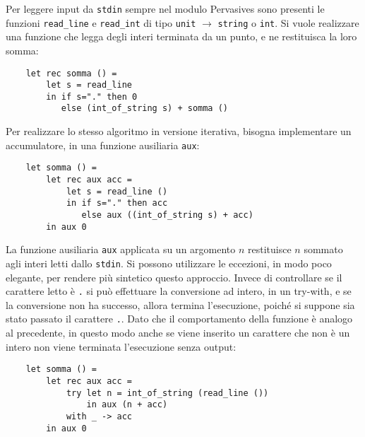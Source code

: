 \documentclass{article}
\numberwithin{equation}{subsection}
\begin{document}
Per leggere input da \verb|stdin| sempre nel modulo Pervasives sono presenti le funzioni \verb|read_line| e \verb|read_int| di tipo \verb|unit| $\rightarrow$ \verb|string| o \verb|int|. 
Si vuole realizzare una funzione che legga degli interi terminata da un punto, e ne restituisca la loro somma:
\begin{verbatim}
    let rec somma () =
        let s = read_line
        in if s="." then 0
           else (int_of_string s) + somma ()    
\end{verbatim}
Per realizzare lo stesso algoritmo in versione iterativa, bisogna implementare un accumulatore, in una funzione ausiliaria \verb|aux|:
\begin{verbatim}
    let somma () =
        let rec aux acc = 
            let s = read_line ()
            in if s="." then acc
               else aux ((int_of_string s) + acc)
        in aux 0
\end{verbatim}
La funzione ausiliaria \verb|aux| applicata su un argomento $n$ restituisce $n$ sommato agli interi letti dallo \verb|stdin|. Si possono utilizzare le eccezioni, in modo poco elegante, per rendere più sintetico questo approccio. Invece di controllare se il carattere letto è \verb|.| si può effettuare la conversione ad intero, in un try-with, e se la conversione non ha successo, allora termina l'esecuzione, poiché si suppone sia stato passato il carattere \verb|.|. Dato che il comportamento della funzione è analogo al precedente, in questo modo anche se viene inserito un carattere che non è un intero non viene terminata l'esecuzione senza output:
\begin{verbatim}
    let somma () =
        let rec aux acc =
            try let n = int_of_string (read_line ())
                in aux (n + acc)
            with _ -> acc
        in aux 0
\end{verbatim}

\end{document}

